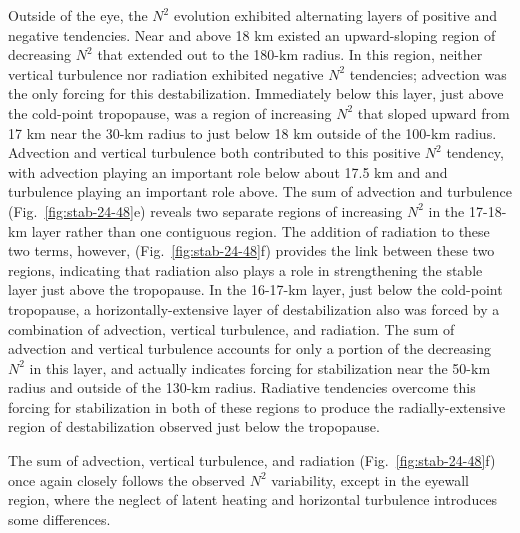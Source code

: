 Outside of the eye, the $N^2$ evolution exhibited alternating layers of positive and negative tendencies.
Near and above 18 km existed an upward-sloping region of decreasing $N^2$ that extended out to the 180-km radius.
In this region, neither vertical turbulence nor radiation exhibited negative $N^2$ tendencies; advection was the only forcing for this destabilization.
Immediately below this layer, just above the cold-point tropopause, was a region of increasing $N^2$ that sloped upward from 17 km near the 30-km radius to just below 18 km outside of the 100-km radius.
Advection and vertical turbulence both contributed to this positive $N^2$ tendency, with advection playing an important role below about 17.5 km and and turbulence playing an important role above.
The sum of advection and turbulence (Fig.~\ref{fig:stab-24-48}e) reveals two separate regions of increasing $N^2$ in the 17-18-km layer rather than one contiguous region.
The addition of radiation to these two terms, however, (Fig.~\ref{fig:stab-24-48}f) provides the link between these two regions, indicating that radiation also plays a role in strengthening the stable layer just above the tropopause.
In the 16-17-km layer, just below the cold-point tropopause, a horizontally-extensive layer of destabilization also was forced by a combination of advection, vertical turbulence, and radiation.
The sum of advection and vertical turbulence accounts for only a portion of the decreasing $N^2$ in this layer, and actually indicates forcing for stabilization near the 50-km radius and outside of the 130-km radius.
Radiative tendencies overcome this forcing for stabilization in both of these regions to produce the radially-extensive region of destabilization observed just below the tropopause.

The sum of advection, vertical turbulence, and radiation (Fig.~\ref{fig:stab-24-48}f) once again closely follows the observed $N^2$ variability, except in the eyewall region, where the neglect of latent heating and horizontal turbulence introduces some differences.

